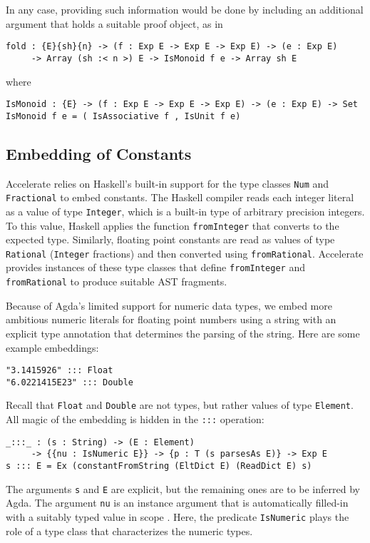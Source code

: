 \documentclass{llncs}
\begin{document}
In any case, providing such information would be done by including an
additional argument that holds a suitable proof object, as in
\begin{verbatim}
fold : {E}{sh}{n} -> (f : Exp E -> Exp E -> Exp E) -> (e : Exp E)
     -> Array (sh :< n >) E -> IsMonoid f e -> Array sh E
\end{verbatim}
where
\begin{verbatim}
IsMonoid : {E} -> (f : Exp E -> Exp E -> Exp E) -> (e : Exp E) -> Set
IsMonoid f e = ( IsAssociative f , IsUnit f e)
\end{verbatim}

\subsection{Embedding of Constants}
\label{sec:embedding-constants}


Accelerate relies on Haskell's built-in support for the type classes
\texttt{Num} and \texttt{Fractional} to embed constants. The Haskell compiler reads each integer
literal as a value of type \texttt{Integer}, which is a built-in type
of arbitrary precision integers. To this value, Haskell applies the
function \texttt{fromInteger} that converts to the expected
type. Similarly, floating point constants are read as values of
type \texttt{Rational} (\texttt{Integer} fractions) and then converted
using \texttt{fromRational}. Accelerate provides instances of
these type classes that define \texttt{fromInteger} and
\texttt{fromRational} to produce suitable AST fragments.

Because of Agda's limited support for numeric data types,
we embed more ambitious numeric literals for floating point numbers
using a string with an explicit type annotation that determines the
parsing of the string. Here are some example embeddings:
\begin{verbatim}
"3.1415926" ::: Float
"6.0221415E23" ::: Double
\end{verbatim}
Recall that \texttt{Float} and \texttt{Double} are not
types, but rather values of type \texttt{Element}.
All magic of the embedding is hidden in the \texttt{:::} operation:
\begin{verbatim}
_:::_ : (s : String) -> (E : Element) 
     -> {{nu : IsNumeric E}} -> {p : T (s parsesAs E)} -> Exp E
s ::: E = Ex (constantFromString (EltDict E) (ReadDict E) s)
\end{verbatim}
The arguments \texttt{s} and \texttt{E} are explicit, but the
remaining ones are to be inferred by Agda.
The argument \texttt{nu} is an instance argument that is automatically
filled-in with a suitably typed value in scope
\cite{DevriesePiessens2011}. Here, the predicate 
\texttt{IsNumeric} plays the role of a type class that characterizes
the numeric types.
\end{document}
